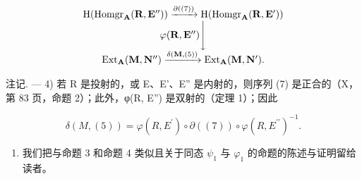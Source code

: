 \[
\begin{array}{c} \mathrm{H} (\operatorname{Homgr} _ {\mathbf {A}} (\mathbf {R}, \mathbf {E} ^ {\prime \prime})) \xrightarrow {\partial ((7))} \mathrm{H} (\operatorname{Homgr} _ {\mathbf {A}} (\mathbf {R}, \mathbf {E} ^ {\prime})) \\ \varphi (\mathbf {R}, \mathbf {E} ^ {\prime \prime}) \Biggl \downarrow \\ \operatorname{Ext} _ {\mathbf {A}} (\mathbf {M}, \mathbf {N} ^ {\prime \prime}) \xrightarrow {\delta (\mathbf {M} , (5))} \operatorname{Ext} _ {\mathbf {A}} (\mathbf {M}, \mathbf {N} ^ {\prime}). \end{array}
\]

注记. --- 4) 若 R 是投射的，或 E、E'、E'' 是内射的，则序列 (7) 是正合的（X，第 83 页，命题 2）；此外，φ(R, E'') 是双射的（定理 1）；因此

\[
\delta (M, (5)) = \varphi (R, E ^ {\prime}) \circ \partial ((7)) \circ \varphi (R, E ^ {\prime \prime}) ^ {- 1}.
\]

\begin{enumerate}
\def\labelenumi{\arabic{enumi})}
\setcounter{enumi}{4}
\tightlist
\item
  我们把与命题 3 和命题 4 类似且关于同态 \(\psi_{1}\) 与 \(\varphi_{1}\) 的命题的陈述与证明留给读者。
\end{enumerate}

